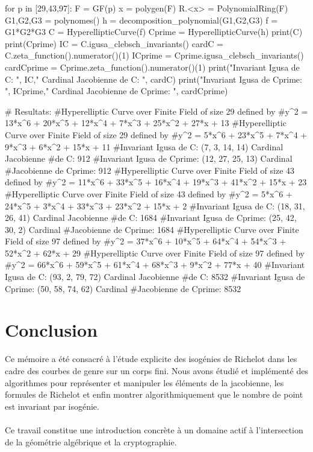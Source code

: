 \documentclass[12pt,a4paper]{article}
\begin{document}
	\begin{sageblock}
	for p in [29,43,97]:
			F = GF(p)
			x = polygen(F)
			R.<x> = PolynomialRing(F)
			G1,G2,G3 = polynomes()
			h = decomposition_polynomial(G1,G2,G3)
			f = G1*G2*G3
			C = HyperellipticCurve(f)
			Cprime = HyperellipticCurve(h)
			print(C)
			print(Cprime)
			IC  = C.igusa_clebsch_invariants()
			cardC  = C.zeta_function().numerator()(1)
			ICprime = Cprime.igusa_clebsch_invariants()              
			cardCprime  = Cprime.zeta_function().numerator()(1)
			print("Invariant Igusa de C: ", IC," Cardinal Jacobienne de C: ",
			cardC)
			print("Invariant Igusa de Cprime: ", ICprime," Cardinal 
			Jacobienne de Cprime: ", cardCprime)
			
				
				# Resultats:
				#Hyperelliptic Curve over Finite Field of size 29 defined by 
				#y^2 = 13*x^6 + 20*x^5 + 12*x^4 + 7*x^3 + 25*x^2 + 27*x + 13
				#Hyperelliptic Curve over Finite Field of size 29 defined by 
				#y^2 = 5*x^6 + 23*x^5 + 7*x^4 + 9*x^3 + 6*x^2 + 15*x + 11
				#Invariant Igusa de C:  (7, 3, 14, 14)  Cardinal Jacobienne 
				#de C:  912
				#Invariant Igusa de Cprime:  (12, 27, 25, 13)  Cardinal 
				#Jacobienne de Cprime:  912
				#Hyperelliptic Curve over Finite Field of size 43 defined by 
				#y^2 = 11*x^6 + 33*x^5 + 16*x^4 + 19*x^3 + 41*x^2 + 15*x + 23
				#Hyperelliptic Curve over Finite Field of size 43 defined by 
				#y^2 = 5*x^6 + 24*x^5 + 3*x^4 + 33*x^3 + 23*x^2 + 15*x + 2
				#Invariant Igusa de C:  (18, 31, 26, 41)  Cardinal Jacobienne 
				#de C:  1684
				#Invariant Igusa de Cprime:  (25, 42, 30, 2)  Cardinal 
				#Jacobienne de Cprime:  1684
				#Hyperelliptic Curve over Finite Field of size 97 defined by 
				#y^2 = 37*x^6 + 10*x^5 + 64*x^4 + 54*x^3 + 52*x^2 + 62*x + 29
				#Hyperelliptic Curve over Finite Field of size 97 defined by 
				#y^2 = 66*x^6 + 59*x^5 + 61*x^4 + 68*x^3 + 9*x^2 + 77*x + 40
				#Invariant Igusa de C:  (93, 2, 79, 72)  Cardinal Jacobienne 
				#de C:  8532
				#Invariant Igusa de Cprime:  (50, 58, 74, 62)  Cardinal 
				#Jacobienne de Cprime:  8532
	\end{sageblock} 
	\newpage	
	\section{Conclusion}
	Ce mémoire a été consacré \`a l'étude explicite des isogénies de Richelot dans les cadre des courbes de genre sur un corps fini. Nous avons étudié et implémenté des algorithmes pour représenter et manipuler les éléments de la jacobienne, les formules de Richelot et enfin montrer algorithmiquement que le nombre de point est invariant par isogénie. \\\\
	Ce travail constitue une introduction concrète \`a un domaine actif \`a l'intersection de la géométrie algébrique et la cryptographie. 
	\newpage
\end{document}
